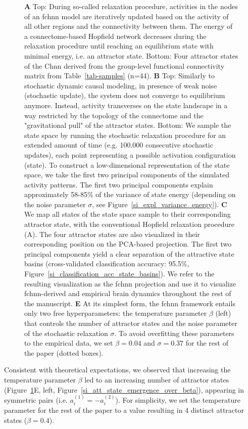 \documentclass{article}
\begin{document}
\begin{figure}[!htbp]
{\textbf{A} Top: During so-called relaxation procedure, activities in the nodes of an \acrshort{fchnn} model are iteratively updated based on the activity of all other regions and the connectivity between them. The energy of a
connectome-based Hopfield network decreases during the relaxation procedure until reaching an equilibrium state with
minimal energy, i.e. an attractor state. Bottom: Four attractor states of the C\acrshort{hnn} derived from the
group-level functional connectivity matrix from Table~\ref{tab-samples} (n=44).
\textbf{B} Top: Similarly to stochastic dynamic causal modeling, in presence of weak noise (stochastic update), the system
does not converge to equilibrium anymore. Instead, activity transverses on the state landscape in a way
restricted by the topology of the connectome and the "gravitational pull" of the attractor states. Bottom: We sample
the state space by running the stochastic relaxation procedure for an extended amount of time (e.g. 100.000 consecutive
stochastic updates), each point representing a possible activation configuration (state). To construct a
low-dimensional representation of the state space, we take the first two principal components of the simulated activity
patterns. The first two principal components explain approximately 58-85\% of the variance of state energy (depending
on the noise parameter $\sigma$, see Figure~\ref{si_expl_variance_energy}).
\textbf{C} We map all states of the state space sample to their corresponding attractor state, with the conventional
Hopfield relaxation procedure (A). The four attractor states are also visualized in their corresponding position on the
PCA-based projection. The first two principal components yield a clear separation of the attractive state basins
(cross-validated classification accuracy: 95.5\%, Figure~\ref{si_classification_acc_state_basins}). We refer to the resulting visualization
as the \acrshort{fchnn} projection and use it to visualize \acrshort{fchnn}-derived and empirical brain dynamics throughout the rest of
the manuscript.
\textbf{E} At its simplest form, the \acrshort{fchnn} framework entails only two free hyperparameters: the temperature parameter
$\beta$ (left) that controls the number of attractor states and the noise parameter of the stochastic relaxation
$\sigma$. To avoid overfitting these parameters to the empirical data, we set $\beta=0.04$ and $\sigma=0.37$ for the
rest of the paper (dotted boxes).}
\label{attractors}
\end{figure}

Consistent with theoretical expectations, we observed that increasing the temperature parameter $\beta$ led to an
increasing number of attractor states (Figure~\ref{attractors}E, left, Figure~\ref{si_att_state_emergence_over_beta}), appearing in symmetric pairs
(i.e. $a_i^{(1)} = -a_i^{(2)}$). For simplicity, we set the temperature parameter for the rest of the paper to a value
resulting in 4 distinct attractor states ($\beta=0.4$).
\end{document}

